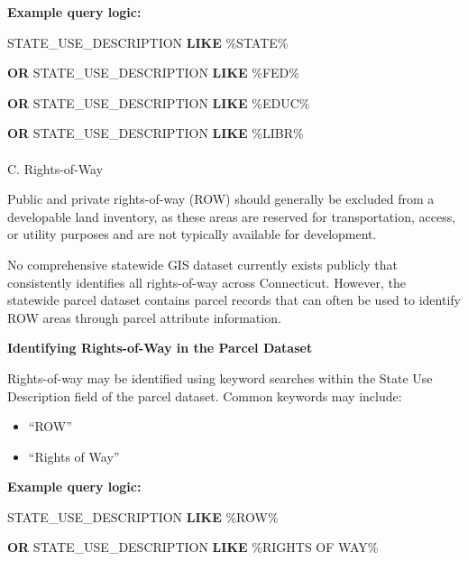 \documentclass[
  letterpaper,
  DIV=11,
  numbers=noendperiod]{scrreprt}
\makeatletter
\let\oldparagraph\paragraph
\renewcommand{\paragraph}{
    \@ifstar
      \xxxParagraphStar
      \xxxParagraphNoStar
  }
\newcommand{\xxxParagraphStar}[1]{\oldparagraph*{#1}\mbox{}}
\newcommand{\xxxParagraphNoStar}[1]{\oldparagraph{#1}\mbox{}}
\newenvironment{Shaded}{\begin{snugshade}}{\end{snugshade}}
\newcommand{\KeywordTok}[1]{\textcolor[rgb]{0.00,0.23,0.31}{\textbf{#1}}}
\newcommand{\NormalTok}[1]{\textcolor[rgb]{0.00,0.23,0.31}{#1}}
\newcommand{\StringTok}[1]{\textcolor[rgb]{0.13,0.47,0.30}{#1}}
\providecommand{\tightlist}{%
  \setlength{\itemsep}{0pt}\setlength{\parskip}{0pt}}
\makeatother
\begin{document}
\textbf{Example query logic:}

\begin{Shaded}
\begin{Highlighting}[]
\NormalTok{STATE\_USE\_DESCRIPTION }\KeywordTok{LIKE} \StringTok{\textquotesingle{}\%STATE\%\textquotesingle{}}
    
\KeywordTok{OR}\NormalTok{ STATE\_USE\_DESCRIPTION }\KeywordTok{LIKE} \StringTok{\textquotesingle{}\%FED\%\textquotesingle{}}
    
\KeywordTok{OR}\NormalTok{ STATE\_USE\_DESCRIPTION }\KeywordTok{LIKE} \StringTok{\textquotesingle{}\%EDUC\%\textquotesingle{}}

\KeywordTok{OR}\NormalTok{ STATE\_USE\_DESCRIPTION }\KeywordTok{LIKE} \StringTok{\textquotesingle{}\%LIBR\%\textquotesingle{}}
\end{Highlighting}
\end{Shaded}

\paragraph{C. Rights-of-Way}\label{c.-rights-of-way}

Public and private rights-of-way (ROW) should generally be excluded from
a developable land inventory, as these areas are reserved for
transportation, access, or utility purposes and are not typically
available for development.

No comprehensive statewide GIS dataset currently exists publicly that
consistently identifies all rights-of-way across Connecticut. However,
the statewide parcel dataset contains parcel records that can often be
used to identify ROW areas through parcel attribute information.

\textbf{Identifying Rights-of-Way in the Parcel Dataset}

Rights-of-way may be identified using keyword searches within the State
Use Description field of the parcel dataset. Common keywords may
include:

\begin{itemize}
\tightlist
\item
  ``ROW''
\item
  ``Rights of Way''
\end{itemize}

\textbf{Example query logic:}

\begin{Shaded}
\begin{Highlighting}[]
\NormalTok{STATE\_USE\_DESCRIPTION }\KeywordTok{LIKE} \StringTok{\textquotesingle{}\%ROW\%\textquotesingle{}}

\KeywordTok{OR}\NormalTok{ STATE\_USE\_DESCRIPTION }\KeywordTok{LIKE} \StringTok{\textquotesingle{}\%RIGHTS OF WAY\%\textquotesingle{}}
\end{Highlighting}
\end{Shaded}
\end{document}
